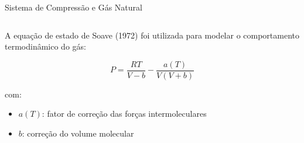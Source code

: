 \begin{frame}{Sistema de Compressão e Gás Natural}
\begin{columns}[T]
\begin{column}{0.52\textwidth}
            \vspace{0.15cm}
            A equação de estado de Soave (1972) foi utilizada para modelar o comportamento termodinâmico do gás:

            \[
            P = \frac{R T}{V - b} - \frac{a(T)}{V(V + b)}
            \]

            com:
            \begin{itemize}
                \item \( a(T) \): fator de correção das forças intermoleculares
                \item \( b \): correção do volume molecular
            \end{itemize}
        \end{column}
    \end{columns}
\end{frame}



